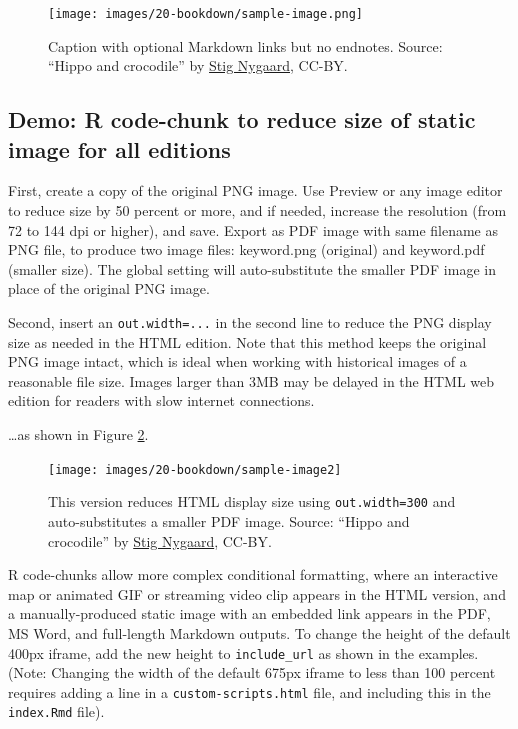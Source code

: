 \documentclass[
  english,
]{book}
\begin{document}
\begin{figure}
\centering
\texttt{[image: images/20-bookdown/sample-image.png]}
\caption{\label{fig:sample-image}Caption with optional Markdown links but no endnotes. Source: ``Hippo and crocodile'' by \href{https://www.flickr.com/photos/10259776@N00}{Stig Nygaard}, CC-BY.}
\end{figure}

\hypertarget{demo-r-code-chunk-to-reduce-size-of-static-image-for-all-editions}{%
\subsection*{Demo: R code-chunk to reduce size of static image for all editions}\label{demo-r-code-chunk-to-reduce-size-of-static-image-for-all-editions}}

First, create a copy of the original PNG image. Use Preview or any image editor to reduce size by 50 percent or more, and if needed, increase the resolution (from 72 to 144 dpi or higher), and save. Export as PDF image with same filename as PNG file, to produce two image files: keyword.png (original) and keyword.pdf (smaller size). The global setting will auto-substitute the smaller PDF image in place of the original PNG image.

Second, insert an \texttt{out.width=...} in the second line to reduce the PNG display size as needed in the HTML edition. Note that this method keeps the original PNG image intact, which is ideal when working with historical images of a reasonable file size. Images larger than 3MB may be delayed in the HTML web edition for readers with slow internet connections.

\ldots as shown in Figure \ref{fig:sample-image2}.



\begin{figure}
\texttt{[image: images/20-bookdown/sample-image2]} \caption{This version reduces HTML display size using \texttt{out.width=300} and auto-substitutes a smaller PDF image. Source: ``Hippo and crocodile'' by \href{https://www.flickr.com/photos/10259776@N00}{Stig Nygaard}, CC-BY.}\label{fig:sample-image2}
\end{figure}

R code-chunks allow more complex conditional formatting, where an interactive map or animated GIF or streaming video clip appears in the HTML version, and a manually-produced static image with an embedded link appears in the PDF, MS Word, and full-length Markdown outputs. To change the height of the default 400px iframe, add the new height to \texttt{include\_url} as shown in the examples. (Note: Changing the width of the default 675px iframe to less than 100 percent requires adding a line in a \texttt{custom-scripts.html} file, and including this in the \texttt{index.Rmd} file).
\end{document}
